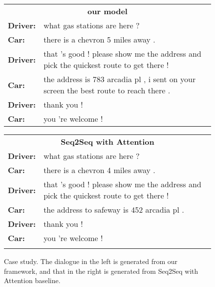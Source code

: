 \documentclass[11pt]{article}
\begin{document}
\begin{figure}[!t]
\begin{minipage}{0.49 \textwidth}
		\begin{tabular}{lp{5.7cm}}
			\multicolumn{2}{c}{\textbf{our model}}\\
			\textbf{Driver:} & what gas stations are here ?\\
			\textbf{Car:} & there is a chevron 5 miles away .\\
			\textbf{Driver:} & that 's good ! please show me the address and pick the quickest route to get there !\\
			\textbf{Car:} & the address is 783 arcadia pl , i sent on your screen the best route to reach there .\\
			\textbf{Driver:} & thank you !\\
			\textbf{Car:} & you 're welcome ! \\
		\end{tabular}
	\end{minipage}
	\begin{minipage}{0.49\textwidth}
		\raggedleft
		\begin{tabular}{lp{5.7cm}}
			\multicolumn{2}{c}{\textbf{Seq2Seq with Attention}}\\
			\textbf{Driver:} & what gas stations are here ?\\
			\textbf{Car:} & there is a chevron 4 miles away .\\
			\textbf{Driver:} & that 's good ! please show me the address and pick the quickest route to get there !\\
			\textbf{Car:} & the address to safeway is 452 arcadia pl .\\
			\textbf{Driver:} & thank you !\\
			\textbf{Car:} & you 're welcome ! \\
			&\\
		\end{tabular}
	\end{minipage}
	\caption{Case study. The dialogue in the left is generated from our framework, and that in the right is generated from Seq2Seq with Attention baseline.}
\end{figure}
\end{document}
